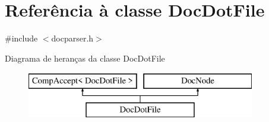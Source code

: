 \hypertarget{class_doc_dot_file}{\section{Referência à classe Doc\-Dot\-File}
\label{class_doc_dot_file}
}


{\ttfamily \#include $<$docparser.\-h$>$}

Diagrama de heranças da classe Doc\-Dot\-File\begin{figure}[H]
\begin{center}
\leavevmode
\includegraphics[height=2.000000cm]{class_doc_dot_file}
\end{center}
\end{figure}
